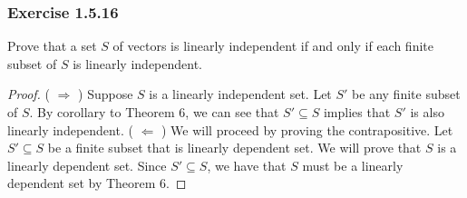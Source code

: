 \subsubsection{Exercise 1.5.16} Prove that a set \( S  \) of vectors is linearly independent if and only if each finite subset of \( S  \) is linearly independent.
\begin{proof}
    (  \( \Rightarrow \)  ) Suppose \( S  \) is a linearly independent set. Let \( S' \) be any finite subset of \( S  \). By corollary to Theorem 6, we can see that \( S' \subseteq S  \) implies that \( S'  \) is also linearly independent. 
    ( \( \Leftarrow \) ) We will proceed by proving the contrapositive. Let \( S' \subseteq S  \) be a finite subset that is linearly dependent set. We will prove that \( S  \) is a linearly dependent set. Since \( S' \subseteq S  \), we have that \( S  \) must be a linearly dependent set by Theorem 6.
\end{proof}

